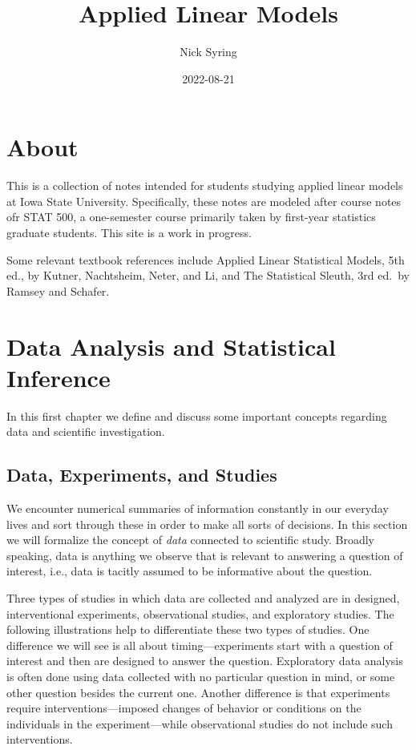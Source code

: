 \documentclass[
]{book}
\title{Applied Linear Models}
\author{Nick Syring}
\date{2022-08-21}
\theoremstyle{definition}
\theoremstyle{definition}
\theoremstyle{definition}
\theoremstyle{definition}
\theoremstyle{remark}
\begin{document}
\maketitle

{
\setcounter{tocdepth}{1}
\tableofcontents
}
\hypertarget{about}{%
\chapter{About}\label{about}}

This is a collection of notes intended for students studying applied linear models at Iowa State University. Specifically, these notes are modeled after course notes ofr STAT 500, a one-semester course primarily taken by first-year statistics graduate students. This site is a work in progress.

Some relevant textbook references include Applied Linear Statistical Models, 5th ed., by Kutner, Nachtsheim, Neter, and Li, and The Statistical Sleuth, 3rd ed.~by Ramsey and Schafer.

\hypertarget{data-analysis-and-statistical-inference}{%
\chapter{Data Analysis and Statistical Inference}\label{data-analysis-and-statistical-inference}}

In this first chapter we define and discuss some important concepts regarding data and scientific investigation.

\hypertarget{data-experiments-and-studies}{%
\section{Data, Experiments, and Studies}\label{data-experiments-and-studies}}

We encounter numerical summaries of information constantly in our everyday lives and sort through these in order to make all sorts of decisions. In this section we will formalize the concept of \emph{data} connected to scientific study. Broadly speaking, data is anything we observe that is relevant to answering a question of interest, i.e., data is tacitly assumed to be informative about the question.

Three types of studies in which data are collected and analyzed are in designed, interventional experiments, observational studies, and exploratory studies. The following illustrations help to differentiate these two types of studies. One difference we will see is all about timing---experiments start with a question of interest and then are designed to answer the question. Exploratory data analysis is often done using data collected with no particular question in mind, or some other question besides the current one. Another difference is that experiments require interventions---imposed changes of behavior or conditions on the individuals in the experiment---while observational studies do not include such interventions.
\end{document}
